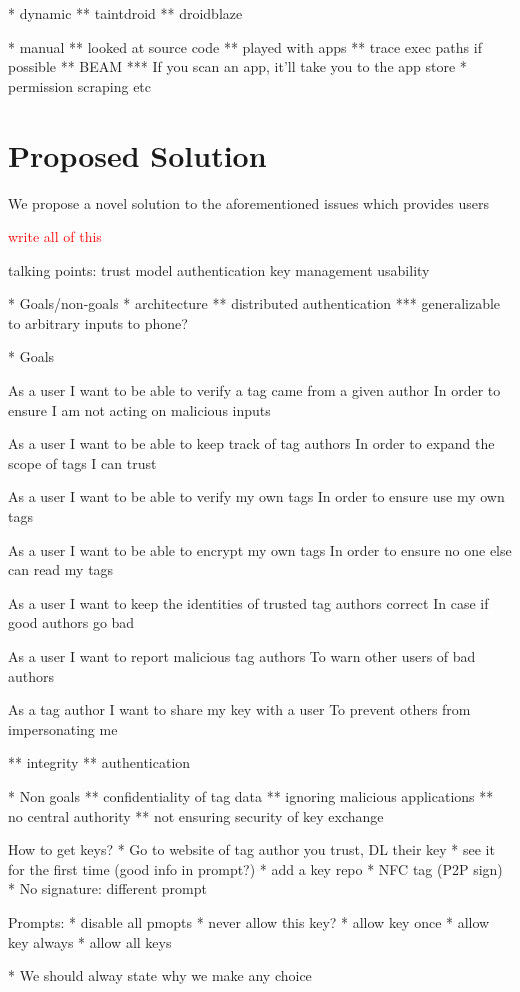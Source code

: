\documentclass[12pt]{article}
\newcommand\TODO[1]{\textcolor{red}{#1}}
\begin{document}
* dynamic
** taintdroid
** droidblaze

* manual
** looked at source code
** played with apps
** trace exec paths if possible
** BEAM
*** If you scan an app, it'll take you to the app store
* permission scraping etc

\section{Proposed Solution}
We propose a novel solution to the aforementioned issues which provides users 

\TODO{write all of this}

talking points:
trust model
authentication
key management
usability

* Goals/non-goals
* architecture
** distributed authentication
*** generalizable to arbitrary inputs to phone?

* Goals

As a user
I want to be able to verify a tag came from a given author
In order to ensure I am not acting on malicious inputs

As a user
I want to be able to keep track of tag authors
In order to expand the scope of tags I can trust

As a user
I want to be able to verify my own tags
In order to ensure use my own tags

As a user
I want to be able to encrypt my own tags
In order to ensure no one else can read my tags

As a user
I want to keep the identities of trusted tag authors correct
In case if good authors go bad

As a user
I want to report malicious tag authors
To warn other users of bad authors

As a tag author
I want to share my key with a user
To prevent others from impersonating me

** integrity
** authentication

* Non goals
** confidentiality of tag data
** ignoring malicious applications
** no central authority
** not ensuring security of key exchange


How to get keys?
* Go to website of tag author you trust, DL their key
* see it for the first time (good info in prompt?)
* add a key repo
* NFC tag (P2P sign)
* No signature: different prompt

Prompts:
* disable all pmopts
* never allow this key?
* allow key once
* allow key always
* allow all keys

* We should alway state why we make any choice
\end{document}

